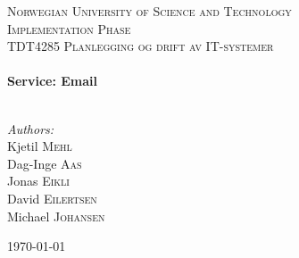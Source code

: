 
\begin{titlepage}

\begin{center}
 

\textsc{\LARGE Norwegian University of Science and Technology}\\[1.5cm]

 
\textsc{\Large Implementation Phase}\\[0.5cm]

\textsc{\large TDT4285 Planlegging og drift av IT-systemer}\\[0.5cm]
 
 
\HRule \\[0.4cm]
{ \huge \bfseries Service: Email}\\[0.4cm]
 
\HRule \\[1.5cm]
 

\begin{center} \Large
\emph{Authors:}\\
Kjetil \textsc{Mehl}\\
Dag-Inge \textsc{Aas}\\
Jonas \textsc{Eikli}\\
David \textsc{Eilertsen}\\
Michael \textsc{Johansen}\\[3cm]
\end{center}
 

{\large \today}\\[4cm] %
 
\vfill
\end{center}

\end{titlepage}
